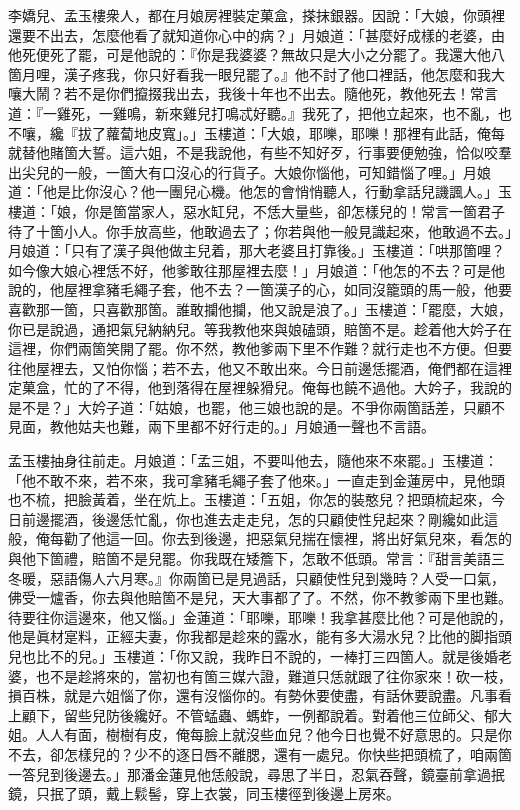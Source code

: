 李嬌兒、孟玉樓衆人，都在月娘房裡裝定菓盒，搽抹銀器。因說：「大娘，你頭裡還要不出去，怎麼他看了就知道你心中的病？」月娘道：「甚麼好成樣的老婆，由他死便死了罷，可是他說的：『你是我婆婆？無故只是大小之分罷了。我還大他八箇月哩，漢子疼我，你只好看我一眼兒罷了。』他不討了他口裡話，他怎麼和我大嚷大鬧？{}若不是你們攛掇我出去，我後十年也不出去。隨他死，教他死去！常言道：『一雞死，一雞鳴，新來雞兒打鳴忒好聽。』{}我死了，把他立起來，也不亂，也不嚷，纔『拔了蘿蔔地皮寬」。」玉樓道：「大娘，耶嚛，耶嚛！那裡有此話，俺每就替他賭箇大誓。這六姐，不是我說他，有些不知好歹，行事要便勉強，恰似咬羣出尖兒的一般，一箇大有口沒心的行貨子。{}大娘你惱他，可知錯惱了哩。」{}月娘道：「他是比你沒心？他一團兒心機。他怎的會悄悄聽人，行動拿話兒譏諷人。」玉樓道：「娘，你是箇當家人，惡水缸兒，不恁大量些，卻怎樣兒的！常言一箇君子待了十箇小人。{}你手放高些，他敢過去了；你若與他一般見識起來，他敢過不去。」月娘道：「只有了漢子與他做主兒着，那大老婆且打靠後。」玉樓道：「哄那箇哩？如今像大娘心裡恁不好，他爹敢往那屋裡去麼！」月娘道：「他怎的不去？可是他說的，他屋裡拿豬毛繩子套，他不去？一箇漢子的心，如同沒籠頭的馬一般，他要喜歡那一箇，只喜歡那箇。誰敢攔他攔，他又說是浪了。」{}玉樓道：「罷麼，大娘，你已是說過，通把氣兒納納兒。等我教他來與娘磕頭，賠箇不是。趁着他大妗子在這裡，你們兩箇笑開了罷。你不然，教他爹兩下里不作難？就行走也不方便。但要往他屋裡去，又怕你惱；若不去，他又不敢出來。今日前邊恁擺酒，俺們都在這裡定菓盒，忙的了不得，他到落得在屋裡躲猾兒。俺每也饒不過他。大妗子，我說的是不是？」大妗子道：「姑娘，也罷，他三娘也說的是。不爭你兩箇話差，只顧不見面，教他姑夫也難，兩下里都不好行走的。」月娘通一聲也不言語。

孟玉樓抽身往前走。{}月娘道：「孟三姐，不要叫他去，隨他來不來罷。」玉樓道：「他不敢不來，若不來，我可拿豬毛繩子套了他來。」{}{}一直走到金蓮房中，見他頭也不梳，把臉黃着，坐在炕上。玉樓道：「五姐，你怎的裝憨兒？把頭梳起來，今日前邊擺酒，後邊恁忙亂，你也進去走走兒，怎的只顧使性兒起來？剛纔如此這般，俺每勸了他這一回。你去到後邊，把惡氣兒揣在懷裡，將出好氣兒來，看怎的與他下箇禮，賠箇不是兒罷。你我既在矮簷下，怎敢不低頭。常言：『甜言美語三冬暖，惡語傷人六月寒。』你兩箇已是見過話，只顧使性兒到幾時？人受一口氣，佛受一爐香，你去與他賠箇不是兒，天大事都了了。不然，你不教爹兩下里也難。待要往你這邊來，他又惱。」{}金蓮道：「耶嚛，耶嚛！我拿甚麼比他？{}可是他說的，他是眞材寔料，正經夫妻，你我都是趁來的露水，能有多大湯水兒？比他的脚指頭兒也比不的兒。」玉樓道：「你又說，我昨日不說的，一棒打三四箇人。就是後婚老婆，也不是趁將來的，當初也有箇三媒六證，難道只恁就跟了往你家來！砍一枝，損百株，就是六姐惱了你，還有沒惱你的。有勢休要使盡，有話休要說盡。凡事看上顧下，留些兒防後纔好。不管蜢蟲、螞蚱，一例都說着。對着他三位師父、郁大姐。人人有面，樹樹有皮，俺每臉上就沒些血兒？他今日也覺不好意思的。只是你不去，卻怎樣兒的？少不的逐日唇不離腮，還有一處兒。你快些把頭梳了，咱兩箇一答兒到後邊去。」那潘金蓮見他恁般說，尋思了半日，忍氣吞聲，{}鏡臺前拿過抿鏡，只抿了頭，戴上鬏髻，穿上衣裳，同玉樓徑到後邊上房來。

